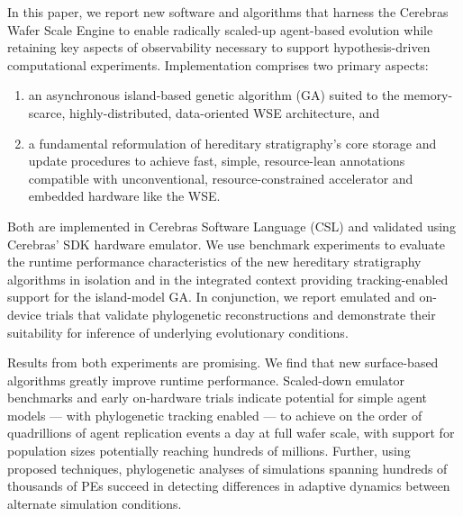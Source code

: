 In this paper, we report new software and algorithms that harness the Cerebras Wafer Scale Engine to enable radically scaled-up agent-based evolution while retaining key aspects of observability necessary to support hypothesis-driven computational experiments.
Implementation comprises two primary aspects:
\begin{enumerate}
  \item an asynchronous island-based genetic algorithm (GA) suited to the memory-scarce, highly-distributed, data-oriented WSE architecture, and
  \item a fundamental reformulation of hereditary stratigraphy's core storage and update procedures to achieve fast, simple, resource-lean annotations compatible with unconventional, resource-constrained accelerator and embedded hardware like the WSE.
\end{enumerate}

Both are implemented in Cerebras Software Language (CSL) and validated using Cerebras' SDK hardware emulator.
We use benchmark experiments to evaluate the runtime performance characteristics of the new hereditary stratigraphy algorithms in isolation and in the integrated context providing tracking-enabled support for the island-model GA.
In conjunction, we report emulated and on-device trials that validate phylogenetic reconstructions and demonstrate their suitability for inference of underlying evolutionary conditions.

Results from both experiments are promising.
We find that new surface-based algorithms greatly improve runtime performance.
Scaled-down emulator benchmarks and early on-hardware trials indicate potential for simple agent models --- with phylogenetic tracking enabled --- to achieve on the order of quadrillions of agent replication events a day at full wafer scale, with support for population sizes potentially reaching hundreds of millions.
Further, using proposed techniques, phylogenetic analyses of simulations spanning hundreds of thousands of PEs succeed in detecting differences in adaptive dynamics between alternate simulation conditions.
